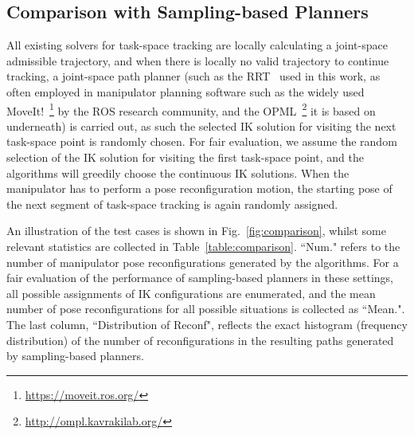\documentclass[letterpaper, 10 pt, journal, twoside]{ieeetran}  %
\begin{document}
\subsection{Comparison with Sampling-based Planners}\label{section:comparison}
All existing solvers for task-space tracking are locally calculating a joint-space admissible trajectory, and when there is locally no valid trajectory to continue tracking, a joint-space path planner (such as the RRT~\cite{Lavalle2006Planning} used in this work, as often employed in manipulator planning software such as the widely used  MoveIt!~\footnote{\url{https://moveit.ros.org/}} by the ROS research community, and the OPML~\footnote{\url{http://ompl.kavrakilab.org/}} it is based on underneath) is carried out, as such the selected IK solution for visiting the next task-space point is randomly chosen. 
For fair evaluation, we assume the random selection of the IK solution for visiting the first task-space point, and the algorithms will greedily choose the continuous IK solutions. 
When the manipulator has to perform a pose reconfiguration motion, the starting pose of the next segment of task-space tracking is again randomly assigned. 

An illustration of the test cases is shown in Fig.~\ref{fig:comparison}, whilst some relevant statistics are collected in Table~\ref{table:comparison}. 
``Num."  refers to the number of manipulator pose reconfigurations generated by the algorithms. 
For a fair evaluation of the performance of sampling-based planners in these settings, all possible assignments of IK configurations are enumerated, and the mean number of pose reconfigurations for all possible situations is collected as ``Mean.". 
The last column, ``Distribution of Reconf", reflects the exact histogram (frequency distribution) of the number of reconfigurations in the resulting paths generated by sampling-based planners. 
\end{document}
